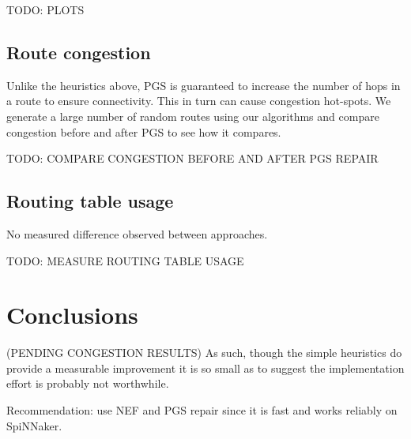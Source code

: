 			TODO: PLOTS
		
		\subsection{Route congestion}
			
			Unlike the heuristics above, PGS is guaranteed to increase the number
			of hops in a route to ensure connectivity. This in turn can cause
			congestion hot-spots. We generate a large number of random routes using
			our algorithms and compare congestion before and after PGS to see how
			it compares.
			
			TODO: COMPARE CONGESTION BEFORE AND AFTER PGS REPAIR
		
		\subsection{Routing table usage}
			
			No measured difference observed between approaches.
			
			TODO: MEASURE ROUTING TABLE USAGE
		
	\section{Conclusions}
		
		(PENDING CONGESTION RESULTS) As such, though the simple heuristics do
		provide a measurable improvement it is so small as to suggest the
		implementation effort is probably not worthwhile.
		
		Recommendation: use NEF and PGS repair since it is fast and works
		reliably on SpiNNaker.
